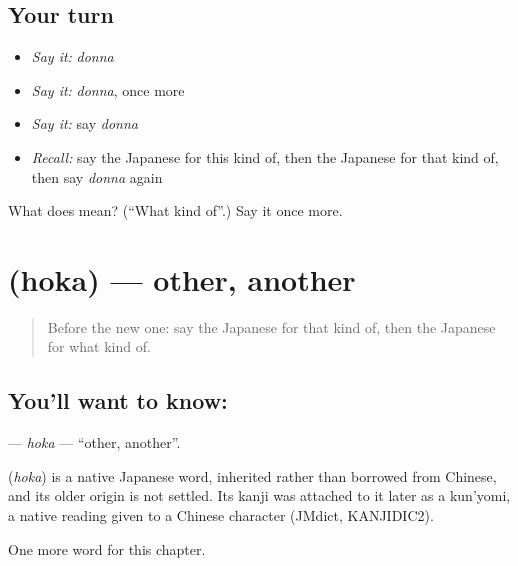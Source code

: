 \subsection*{Your turn}
\begin{itemize}
\raggedright
  \item \emph{Say it:} \emph{donna}
  \item \emph{Say it:} \emph{donna}, once more
  \item \emph{Say it:} say \emph{donna}
  \item \emph{Recall:} say the Japanese for this kind of, then the Japanese for that kind of, then say \emph{donna} again
\end{itemize}

\begin{tcolorbox}[breakable,colback=teal!4,colframe=teal!35!black,title={Before you move on}]
What does  mean? (\textquotedblleft{}What kind of\textquotedblright{}.) Say it once more.
\end{tcolorbox}
\section[\texorpdfstring{\ja{ほか} (hoka)}{ほか (hoka)}]{ (hoka) — other, another}

\label{lesson:JA-C84-hoka}



\begin{quote}
Before the new one: say the Japanese for that kind of, then the Japanese for what kind of.
\end{quote}

\subsection*{You'll want to know: }
\textbf{} — \emph{hoka} — \textquotedblleft{}other, another\textquotedblright{}.

\begin{cousinweb}
\textbf{} (\emph{hoka}) is a native Japanese word, inherited rather than borrowed from Chinese, and its older origin is not settled. Its kanji was attached to it later as a kun'yomi, a native reading given to a Chinese character (JMdict, KANJIDIC2).
\end{cousinweb}

\begin{grammarlens}[title={What you've built}]
One more word for this chapter.
\end{grammarlens}

